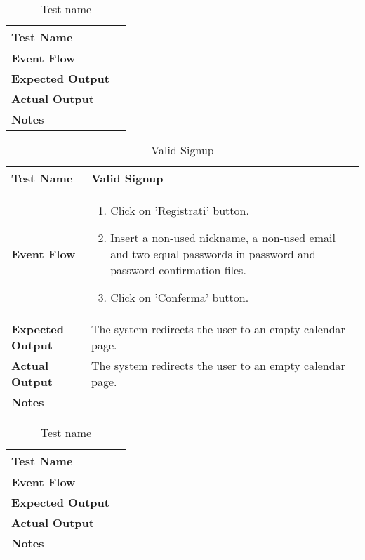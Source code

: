 \begin{table}[h]	
\centering
\def\arraystretch{1.5}
\begin{tabular}{|m{7cm}|m{7cm}|}
	\hline
	\textbf{Test Name}            &    \\ \hline
	\textbf{Event Flow}             &   \\ \hline
	\textbf{Expected Output}  &     \\ \hline
	\textbf{Actual Output}       &     \\ \hline
	\textbf{Notes} & \\ \hline
\end{tabular}
\caption{Test name}
\end{table}


\begin{table}[h]	
	\centering
	\def\arraystretch{1.5}
	\begin{tabular}{|m{7cm}|m{7cm}|}
		\hline
		\textbf{Test Name}            &  Valid Signup  \\ \hline
		\textbf{Event Flow}             &  
		\begin{enumerate}
			\item Click on 'Registrati' button.
			\item Insert a non-used nickname, a non-used email and two equal passwords in password and password confirmation files.
			\item Click on 'Conferma' button.
		\end{enumerate} \\ \hline
		\textbf{Expected Output}  &  The system redirects the user to an empty calendar page.   \\ \hline
		\textbf{Actual Output}       & The system redirects the user to an empty calendar page.    \\ \hline
		\textbf{Notes} & \\ \hline
	\end{tabular}
	\caption{Valid Signup}
\end{table}


\begin{table}[h]	
\centering
\def\arraystretch{1.5}
\begin{tabular}{|m{7cm}|m{7cm}|}
	\hline
	\textbf{Test Name}            &    \\ \hline
	\textbf{Event Flow}             &   \\ \hline
	\textbf{Expected Output}  &     \\ \hline
	\textbf{Actual Output}       &     \\ \hline
	\textbf{Notes} & \\ \hline
\end{tabular}
\caption{Test name}
\end{table}


